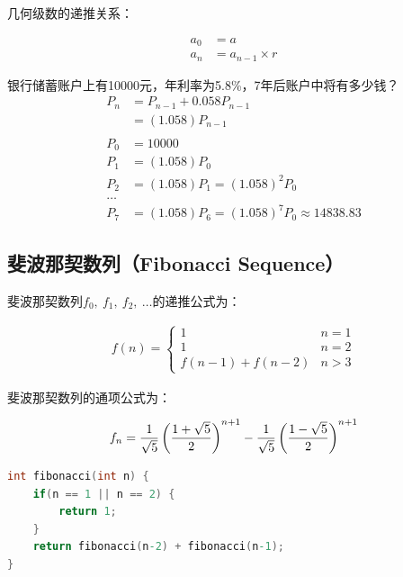 \documentclass[12pt, openany, oneside]{book}
\begin{document}
几何级数的递推关系：

\vspace{-1cm}
\begin{align}
	\nonumber
	a_0 & = a                \\
	\nonumber
	a_n & = a_{n-1} \times r
\end{align}

\begin{tcolorbox}\nonumber
	银行储蓄账户上有10000元，年利率为5.8\%，7年后账户中将有多少钱？
	\begin{align}
		P_n & = P_{n-1} + 0.058P_{n-1}                      \\
		    & = (1.058)P_{n-1}                              \\
		\\
		P_0 & = 10000                                       \\
		P_1 & = (1.058)P_0                                  \\
		P_2 & = (1.058)P_1 = (1.058)^2 P_0                  \\
		\dots                                               \\
		P_7 & = (1.058)P_6 = (1.058)^7 P_0 \approx 14838.83
	\end{align}
\end{tcolorbox}

\subsection{斐波那契数列（Fibonacci Sequence）}

斐波那契数列$ f_0,\ f_1,\ f_2,\ \dots $的递推公式为：

\begin{align}\nonumber
	f(n) = \begin{cases}
		1               & n = 1 \\
		1               & n = 2 \\
		f(n-1) + f(n-2) & n > 3
	\end{cases}
\end{align}

斐波那契数列的通项公式为：

$$
	f_n = {1 \over \sqrt{5}} \left({1 + \sqrt{5} \over 2} \right)^{n+1} - {1 \over \sqrt{5}} \left({1 - \sqrt{5} \over 2} \right)^{n+1}
$$

\begin{lstlisting}[language=C, title=斐波那契数列（递归）]
int fibonacci(int n) {
	if(n == 1 || n == 2) {
		return 1;
	}
	return fibonacci(n-2) + fibonacci(n-1);
}
\end{lstlisting}
\end{document}

